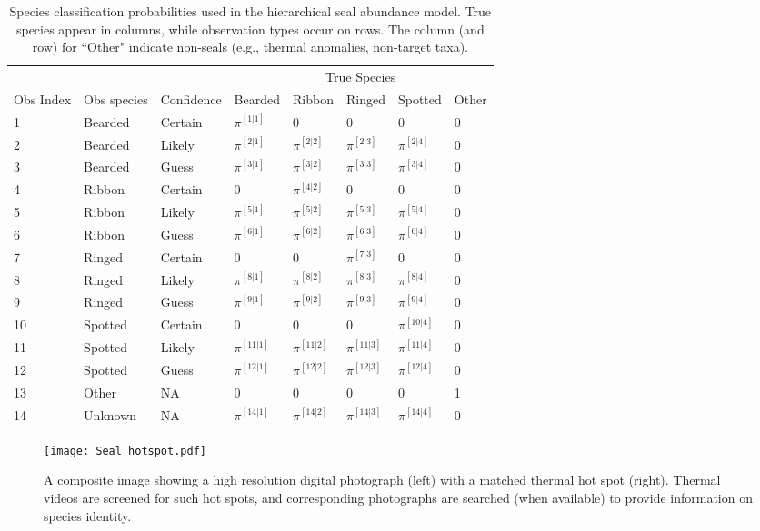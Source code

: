 \documentclass[12pt,fleqn]{article}
\begin{document}
\begin{flushleft}
\begin{table}
\caption{Species classification probabilities used in the hierarchical seal abundance model.  True species
appear in columns, while observation types occur on rows.  The column (and row) for ``Other" indicate 
non-seals (e.g., thermal anomalies, non-target taxa).}
\begin{tabular}{llllllll}
\hline
& & & \multicolumn{5}{c}{True Species} \\ \cline{4-8}
Obs Index & Obs species & Confidence & Bearded & Ribbon & Ringed & Spotted & Other \\
1 & Bearded & Certain & $\pi^{[1|1]}$ & 0 & 0 & 0 & 0 \\
2 & Bearded & Likely &  $\pi^{[2|1]}$ & $\pi^{[2|2]}$ & $\pi^{[2|3]}$ & $\pi^{[2|4]}$ & 0 \\
3 & Bearded & Guess &  $\pi^{[3|1]}$ & $\pi^{[3|2]}$ & $\pi^{[3|3]}$ & $\pi^{[3|4]}$ & 0 \\
4 & Ribbon & Certain & 0 & $\pi^{[4|2]}$ & 0 & 0 & 0 \\
5 & Ribbon & Likely & $\pi^{[5|1]}$ & $\pi^{[5|2]}$ & $\pi^{[5|3]}$ & $\pi^{[5|4]}$ & 0 \\
6 & Ribbon & Guess & $\pi^{[6|1]}$ & $\pi^{[6|2]}$ & $\pi^{[6|3]}$ & $\pi^{[6|4]}$ & 0 \\
7 & Ringed & Certain & 0 & 0 & $\pi^{[7|3]}$ & 0 & 0 \\
8 & Ringed & Likely & $\pi^{[8|1]}$ & $\pi^{[8|2]}$ & $\pi^{[8|3]}$ & $\pi^{[8|4]}$ & 0 \\
9 & Ringed & Guess & $\pi^{[9|1]}$ & $\pi^{[9|2]}$ & $\pi^{[9|3]}$ & $\pi^{[9|4]}$ & 0 \\
10 & Spotted & Certain & 0 & 0 & 0 & $\pi^{[10|4]}$ & 0 \\
11 & Spotted & Likely & $\pi^{[11|1]}$ & $\pi^{[11|2]}$ & $\pi^{[11|3]}$ & $\pi^{[11|4]}$ & 0 \\
12 & Spotted & Guess & $\pi^{[12|1]}$ & $\pi^{[12|2]}$ & $\pi^{[12|3]}$ & $\pi^{[12|4]}$ & 0 \\
13 & Other & NA & 0 & 0 & 0 & 0 & 1 \\
14 & Unknown & NA & $\pi^{[14|1]}$ & $\pi^{[14|2]}$ & $\pi^{[14|3]}$ & $\pi^{[14|4]}$ & 0 \\
\hline
\end{tabular}
\vspace{2cm}
\label{tab:confuse}
\end{table}
 
 
\pagebreak

\begin{figure}[H]
\begin{center}
\texttt{[image: Seal\_hotspot.pdf]}
\end{center}
\caption{A composite image showing a high resolution digital photograph (left) with a matched
thermal hot spot (right).  Thermal videos are screened for such hot spots, and corresponding 
photographs are searched (when available) to provide information on species identity.}
\label{fig:hotspot}
\end{figure}


\end{flushleft}
\end{document}
